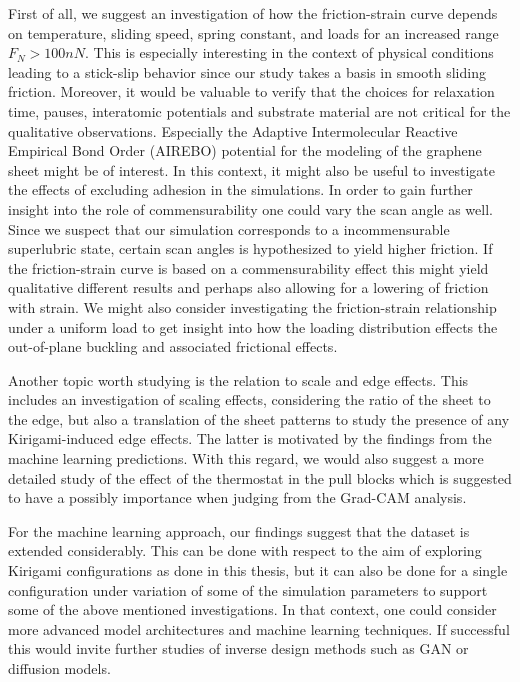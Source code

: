 First of all, we suggest an investigation of how the friction-strain curve
depends on temperature, sliding speed, spring constant, and loads for an
increased range $F_N > 100 nN$. This is especially interesting in the context of
physical conditions leading to a stick-slip behavior since our study takes a
basis in smooth sliding friction. Moreover, it would be valuable to verify that
the choices for relaxation time, pauses, interatomic potentials and substrate
material are not critical for the qualitative observations. Especially the
Adaptive Intermolecular Reactive Empirical Bond Order (AIREBO) potential for the
modeling of the graphene sheet might be of interest. In this context, it might
also be useful to investigate the effects of excluding adhesion in the
simulations. In order to gain further insight into the role of commensurability
one could vary the scan angle as well. Since we suspect that our simulation
corresponds to a incommensurable superlubric state, certain scan angles is
hypothesized to yield higher friction. If the friction-strain curve is based on a commensurability effect this might yield qualitative different results and perhaps also allowing for a lowering of friction with strain. We might also consider investigating the friction-strain relationship under a uniform load to get insight into how the loading distribution effects the out-of-plane buckling and associated frictional effects.

Another topic worth studying is the relation to scale and edge effects. This includes an investigation of scaling effects, considering the ratio of the sheet to the edge, but also a translation of the sheet patterns to study the presence of any Kirigami-induced edge effects. The latter is motivated by the findings from the machine learning predictions. With this regard, we would also suggest a more detailed study of the effect of the thermostat in the pull blocks which is suggested to have a possibly importance when judging from the Grad-CAM analysis. 

For the machine learning approach, our findings suggest that the dataset is extended considerably. This can be done with respect to the aim of exploring Kirigami configurations as done in this thesis, but it can also be done for a single configuration under variation of some of the simulation parameters to support some of the above mentioned investigations. In that context, one could consider more advanced model architectures and machine learning techniques. If successful this would invite further studies of inverse design methods such as GAN or diffusion models. 

